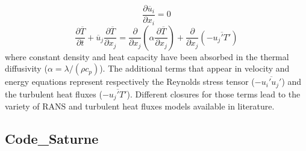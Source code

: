 \documentclass[11pt,letterpaper,english]{article}
\begin{document}
\begin{equation}
\frac{\partial \overline{u}_i}{\partial x_i} = 0
\label{rhoEqnRANS}
\end{equation}
\begin{equation}
 \frac{\partial \overline{T} }{\partial t} + \overline{u}_j \frac{\partial \overline{T}}{\partial x_j}  = \frac{\partial }{\partial x_j} \left( \alpha \frac{\partial \overline{T}}{\partial x_j} \right) +\frac{\partial}{\partial x_j} \left( -\overline{u_j' T'}\right)
\label{EEqnRANS}
\end{equation}
where constant density and heat capacity have been absorbed in the thermal diffusivity ($\alpha = \lambda / (\rho c_p)$). The additional terms that appear in velocity and energy equations represent respectively the Reynolds stress tensor ($-\overline{u_i' u_j'} $) and the turbulent heat fluxes ($ -\overline{u_j' T'}$). Different closures for those terms lead to the variety of RANS and turbulent heat fluxes models available in literature.

\subsection{Code\_Saturne}
\end{document}
